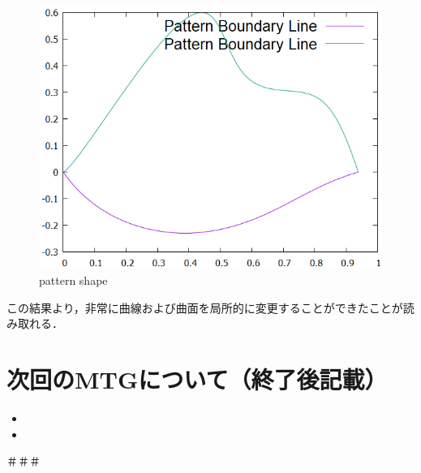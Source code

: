 \documentclass[16.7pt]{jsarticle}
\begin{document}
	\begin{figure}[H]
		\centering
		\includegraphics[width = 0.4\columnwidth]{figure/0415/Patt2.png}
		\caption{pattern shape }
	\end{figure}
	この結果より，非常に曲線および曲面を局所的に変更することができたことが読み取れる．
		
	\section{次回のMTGについて（終了後記載）}
	\begin{itemize}
		\item  
		\item 
	\end{itemize}
	＃＃＃
	\newpage
	

\end{document}
